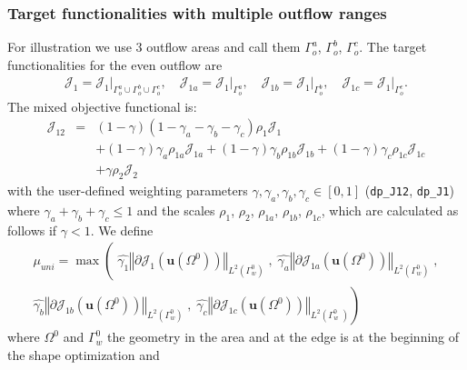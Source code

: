 \documentclass[oneside]{article}
\numberwithin{equation}{section}
\numberwithin{figure}{section}
\newcommand{\Om }{ \Omega}
\newcommand{\buu}{\boldsymbol{u}}
\newcommand{\JJ }{ \mathcal{J}}
\numberwithin{figure}{section}
\begin{document}
\subsubsection{Target functionalities with multiple outflow ranges}
For illustration we use 3 outflow areas and call them $\Gamma_o^a$, $\Gamma_o^b$, $\Gamma_o^c$. The target functionalities for the even outflow are
\begin{eqnarray}
\JJ_{1}=\JJ_{1}\lvert_{\Gamma_o^a \cup \Gamma_o^b \cup \Gamma_o^c },\quad
\JJ_{1a}=\JJ_{1}\lvert_{\Gamma_o^a },\quad
\JJ_{1b}=\JJ_{1}\lvert_{\Gamma_o^b },\quad
\JJ_{1c}=\JJ_{1}\lvert_{\Gamma_o^c }.
\end{eqnarray}
The mixed objective functional is:
\begin{eqnarray}
\JJ_{12}&=&\left(1-\gamma\right)\left(1-\gamma_a -\gamma_b -\gamma_c\right) \rho_1 \JJ_1 \\
& & + \left(1-\gamma\right) \gamma_a \rho_{1a} \JJ_{1a} + \left(1-\gamma\right) \gamma_b \rho_{1b} \JJ_{1b} + \left(1-\gamma\right) \gamma_c \rho_{1c} \JJ_{1c} \\
& & + \gamma \rho_2 \JJ_2
\end{eqnarray}
with the user-defined weighting parameters $\gamma,\gamma_a,\gamma_b,\gamma_c \in [0,1]$ (\verb|dp_J12|, \verb|dp_J1|) where $\gamma_a + \gamma_b + \gamma_c\le 1$ and the scales $\rho_1$, $\rho_2$, $\rho_{1a}$, $\rho_{1b}$, $\rho_{1c}$, which are calculated as follows if $\gamma < 1$. We define
\begin{eqnarray}
\mu_{uni}= \max \left(\;  
\hat{\gamma_1}\left\Vert\partial \JJ_1 \left(\buu \left( \Om^0 \right) \right) \right\Vert_{L^2\left(\Gamma_w^0\right)} \; , \; 
\hat{\gamma_a}\left\Vert\partial \JJ_{1a} \left(\buu \left( \Om^0 \right) \right) \right\Vert_{L^2\left(\Gamma_w^0\right)} \; , \right.\\
\left.\hat{\gamma_b}\left\Vert\partial \JJ_{1b} \left(\buu \left( \Om^0 \right) \right) \right\Vert_{L^2\left(\Gamma_w^0\right)}\; , \;
\hat{\gamma_c}\left\Vert\partial \JJ_{1c} \left(\buu \left( \Om^0 \right) \right) \right\Vert_{L^2\left(\Gamma_w^0 \; \right)}
\right)
\end{eqnarray}
where $\Omega^0$ and $\Gamma_w^0$ the geometry in the area and at the edge is at the beginning of the shape optimization and
\end{document}
